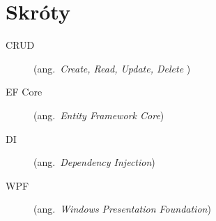 \chapter*{Skróty}\mbox{}
\label{sec:skroty}
\noindent
\begin{description}
  \item [CRUD] (ang.\ \emph{Create, Read, Update, Delete })
  \item [EF Core] (ang.\ \emph{Entity Framework Core})
  \item [DI] (ang.\ \emph{Dependency Injection})
  \item [WPF] (ang.\ \emph{Windows Presentation Foundation})

\end{description}
